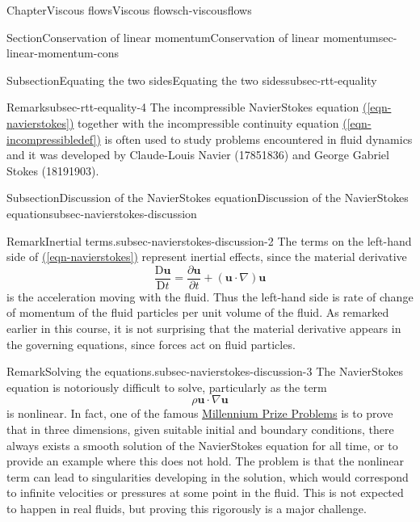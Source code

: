 \documentclass[oneside,10pt,]{book}
\newcommand{\xreffont}{\relax}
\numberwithin{equation}{section}
\newcommand{\DD}[2]{\frac{\mathrm{D}#1}{\mathrm{D}#2}}
\newcommand{\pd}[2]{\frac{\partial#1}{\partial#2}}
\newcommand{\bu}{\boldsymbol{u}}
\begin{document}
\begin{chapterptx}{Chapter}{Viscous flows}{}{Viscous flows}{}{}{ch-viscousflows}
\begin{sectionptx}{Section}{Conservation of linear momentum}{}{Conservation of linear momentum}{}{}{sec-linear-momentum-cons}
\begin{subsectionptx}{Subsection}{Equating the two sides}{}{Equating the two sides}{}{}{subsec-rtt-equality}
\begin{remark}{Remark}{}{subsec-rtt-equality-4}
The incompressible Navier\textendash{}Stokes equation \hyperref[eqn-navierstokes]{({\xreffont\ref{eqn-navierstokes}})} together with the incompressible continuity equation \hyperref[eqn-incompressibledef]{({\xreffont\ref{eqn-incompressibledef}})} is often used to study problems encountered in fluid dynamics and it was developed by Claude-Louis Navier (1785\textendash{}1836) and George Gabriel Stokes (1819\textendash{}1903).%
\end{remark}
\end{subsectionptx}
%
%
\typeout{************************************************}
\typeout{************************************************}
%
\begin{subsectionptx}{Subsection}{Discussion of the Navier\textendash{}Stokes equation}{}{Discussion of the Navier\textendash{}Stokes equation}{}{}{subsec-navierstokes-discussion}
\begin{remark}{Remark}{Inertial terms.}{subsec-navierstokes-discussion-2}%
The terms on the left-hand side of  \hyperref[eqn-navierstokes]{({\xreffont\ref{eqn-navierstokes}})} represent inertial effects, since the material derivative%
\begin{equation*}
\DD{\bu}{t}=\pd{\bu}{t}+(\bu\cdot\nabla)\bu
\end{equation*}
is the acceleration moving with the fluid.  Thus the left-hand side is rate of change of momentum of the fluid particles per unit volume of the fluid. As remarked earlier in this course, it is not surprising that the material derivative appears in the governing equations, since forces act on fluid particles.%
\end{remark}
\begin{remark}{Remark}{Solving the equations.}{subsec-navierstokes-discussion-3}%
The Navier\textendash{}Stokes equation is notoriously difficult to solve, particularly as the term%
\begin{equation*}
\rho\bu\cdot\nabla\bu
\end{equation*}
is nonlinear. In fact, one of the famous \href{https://www.claymath.org/millennium-problems/}{Millennium Prize Problems} is to prove that in three dimensions, given suitable initial and boundary conditions, there always exists a smooth solution of the Navier\textendash{}Stokes equation for all time, or to provide an example where this does not hold.  The problem is that the nonlinear term can lead to singularities developing in the solution, which would correspond to infinite velocities or pressures at some point in the fluid.  This is not expected to happen in real fluids, but proving this rigorously is a major challenge.%

\end{remark}
\end{subsectionptx}
\end{sectionptx}
\end{chapterptx}
\end{document}

